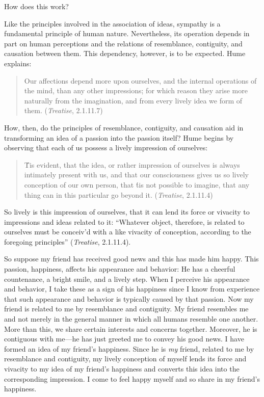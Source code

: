 How does this work?

Like the principles involved in the association of ideas, sympathy is a fundamental principle of human nature. Nevertheless, its operation depends in part on human perceptions and the relations of resemblance, contiguity, and causation between them. This dependency, however, is to be expected. Hume explains:

\begin{quote}
    Our affections depend more upon ourselves, and the internal operations of the mind, than any other impressions; for which reason they arise more naturally from the imagination, and from every lively idea we form of them. (\emph{Treatise}, 2.1.11.7)
\end{quote}

How, then, do the principles of resemblance, contiguity, and causation aid in transforming an idea of a passion into the passion itself? Hume begins by observing that each of us possess a lively impression of ourselves:

\begin{quote}
    \'Tis evident, that the idea, or rather impression of ourselves is always intimately present with us, and that our consciousness gives us so lively conception of our own person, that \'tis not possible to imagine, that any thing can in this particular go beyond it. (\emph{Treatise}, 2.1.11.4)
\end{quote}

So lively is this impression of ourselves, that it can lend its force or vivacity to impressions and ideas related to it: ``Whatever object, therefore, is related to ourselves must be conceiv'd with a like vivacity of conception, according to the foregoing principles'' (\emph{Treatise}, 2.1.11.4).

So suppose my friend has received good news and this has made him happy. This passion, happiness, affects his appearance and behavior: He has a cheerful countenance, a bright smile, and a lively step. When I perceive his appearance and behavior, I take these as a sign of his happiness since I know from experience that such appearance and behavior is typically caused by that passion. Now my friend is related to me by resemblance and contiguity. My friend resembles me and not merely in the general manner in which all humans resemble one another. More than this, we share certain interests and concerns together. Moreover, he is contiguous with me---he has just greeted me to convey his good news. I have formed an idea of my friend's happiness. Since he is \emph{my} friend, related to me by resemblance and contiguity, my lively conception of myself lends its force and vivacity to my idea of my friend's happiness and converts this idea into the corresponding impression. I come to feel happy myself and so share in my friend's happiness. \change

